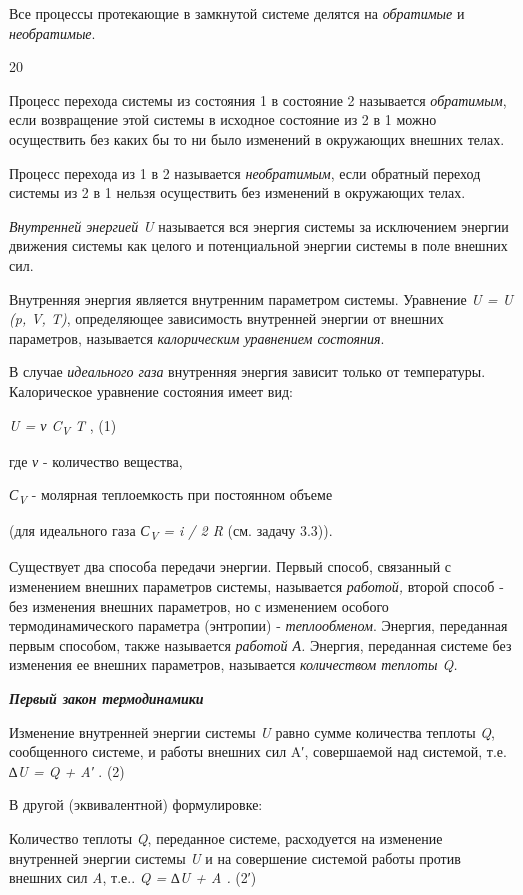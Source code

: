 Все процессы протекающие в замкнутой системе делятся на \emph{обратимые}
и \emph{необратимые}.

20

Процесс перехода системы из состояния 1 в состояние 2 называется
\emph{обратимым}, если возвращение этой системы в исходное состояние из
2 в 1 можно осуществить без каких бы то ни было изменений в окружающих
внешних телах.

Процесс перехода из 1 в 2 называется \emph{необратимым}, если обратный
переход системы из 2 в 1 нельзя осуществить без изменений в окружающих
телах.

\emph{Внутренней энергией U} называется вся энергия системы за
исключением энергии движения системы как целого и потенциальной энергии
системы в поле внешних сил.

Внутренняя энергия является внутренним параметром системы. Уравнение
\emph{U = U (p, V, T)}, определяющее зависимость внутренней энергии от
внешних параметров, называется \emph{калорическим уравнением состояния}.

В случае \emph{идеального газа} внутренняя энергия зависит только от
температуры. Калорическое уравнение состояния имеет вид:

\emph{U = ν C\textsubscript{V} T} , (1)

где \emph{ν} - количество вещества,

\emph{С\textsubscript{V}} - молярная теплоемкость при постоянном объеме

(для идеального газа \emph{С\textsubscript{V} = i / 2 R} (см. задачу
3.3)).

Существует два способа передачи энергии. Первый способ, связанный с
изменением внешних параметров системы, называется \emph{работой,} второй
способ - без изменения внешних параметров, но с изменением особого
термодинамического параметра (энтропии) - \emph{теплообменом}. Энергия,
переданная первым способом, также называется \emph{работой А.} Энергия,
переданная системе без изменения ее внешних параметров, называется
\emph{количеством теплоты Q.}

\emph{\textbf{Первый закон термодинамики}}

Изменение внутренней энергии системы \emph{U} равно сумме количества
теплоты \emph{Q}, сообщенного системе, и работы внешних сил A′,
совершаемой над системой, т.е. \emph{∆U = Q + A′} . (2)

В другой (эквивалентной) формулировке:

Количество теплоты \emph{Q}, переданное системе, расходуется на
изменение внутренней энергии системы \emph{U} и на совершение системой
работы против внешних сил \emph{A}, т.е.. \emph{Q = ∆U + A .} (2′)

